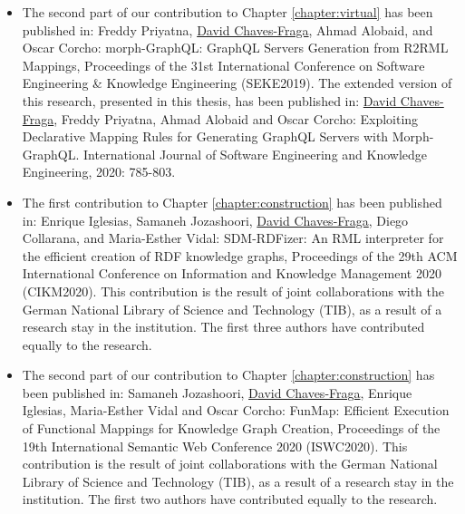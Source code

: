 \begin{itemize}
    \item The second part of our contribution to Chapter \ref{chapter:virtual} has been published in:  Freddy Priyatna, \underline{David Chaves-Fraga}, Ahmad Alobaid, and Oscar Corcho: morph-GraphQL: GraphQL Servers Generation from R2RML Mappings, Proceedings of the 31st International Conference on Software Engineering \& Knowledge Engineering (SEKE2019). The extended version of this research, presented in this thesis, has been published in: \underline{David Chaves-Fraga}, Freddy Priyatna, Ahmad Alobaid and Oscar Corcho: Exploiting Declarative Mapping Rules for Generating GraphQL Servers with Morph-GraphQL. International Journal of Software Engineering and Knowledge Engineering, 2020: 785-803.
    \item The first contribution to Chapter \ref{chapter:construction} has been published in: Enrique Iglesias, Samaneh Jozashoori, \underline{David Chaves-Fraga}, Diego Collarana, and Maria-Esther Vidal: SDM-RDFizer: An RML interpreter for the efficient creation of RDF knowledge graphs, Proceedings of the 29th ACM International Conference on Information and Knowledge Management 2020 (CIKM2020). This contribution is the result of joint collaborations with the German National Library of Science and Technology (TIB), as a result of a research stay in the institution. The first three authors have contributed equally to the research.
    \item The second part of our contribution to Chapter \ref{chapter:construction} has been published in: Samaneh Jozashoori, \underline{David Chaves-Fraga}, Enrique Iglesias, Maria-Esther Vidal and Oscar Corcho: FunMap: Efficient Execution of Functional Mappings for Knowledge Graph Creation, Proceedings of the 19th International Semantic Web Conference 2020 (ISWC2020). This contribution is the result of joint collaborations with the German National Library of Science and Technology (TIB), as a result of a research stay in the institution. The first two authors have contributed equally to the research.
    
\end{itemize}



